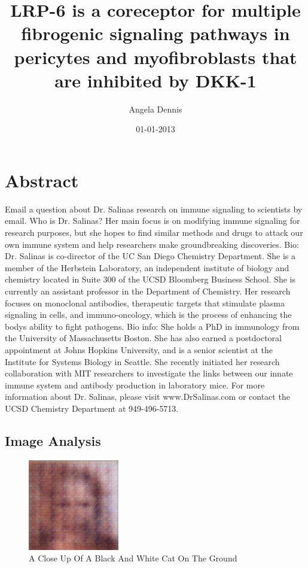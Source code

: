 \documentclass{article}%
\title{LRP{-}6 is a coreceptor for multiple fibrogenic signaling pathways in pericytes and myofibroblasts that are inhibited by DKK{-}1}%
\author{Angela Dennis}%
\affil{Department of Cancer Biology and,}%
\date{01{-}01{-}2013}%
\begin{document}
%
\normalsize%
\maketitle%
\section{Abstract}%
\label{sec:Abstract}%
Email a question about Dr. Salinas research on immune signaling to scientists by email.\newline%
Who is Dr. Salinas? Her main focus is on modifying immune signaling for research purposes, but she hopes to find similar methods and drugs to attack our own immune system and help researchers make groundbreaking discoveries.\newline%
Bio:\newline%
Dr. Salinas is co{-}director of the UC San Diego Chemistry Department. She is a member of the Herbstein Laboratory, an independent institute of biology and chemistry located in Suite 300 of the UCSD Bloomberg Business School. She is currently an assistant professor in the Department of Chemistry. Her research focuses on monoclonal antibodies, therapeutic targets that stimulate plasma signaling in cells, and immuno{-}oncology, which is the process of enhancing the bodys ability to fight pathogens.\newline%
Bio info:\newline%
She holds a PhD in immunology from the University of Massachusetts Boston. She has also earned a postdoctoral appointment at Johns Hopkins University, and is a senior scientist at the Institute for Systems Biology in Seattle. She recently initiated her research collaboration with MIT researchers to investigate the links between our innate immune system and antibody production in laboratory mice.\newline%
For more information about Dr. Salinas, please visit www.DrSalinas.com or contact the UCSD Chemistry Department at 949{-}496{-}5713.

%
\subsection{Image Analysis}%
\label{subsec:ImageAnalysis}%


\begin{figure}[h!]%
\centering%
\includegraphics[width=150px]{500_fake_images/samples_5_70.png}%
\caption{A Close Up Of A Black And White Cat On The Ground}%
\end{figure}

%
\end{document}
